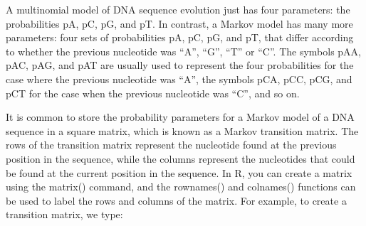 \documentclass[
]{book}
\begin{document}
A multinomial model of DNA sequence evolution just has four parameters: the probabilities pA, pC, pG, and pT. In contrast, a Markov model has many more parameters: four sets of probabilities pA, pC, pG, and pT, that differ according to whether the previous nucleotide was ``A'', ``G'', ``T'' or ``C''. The symbols pAA, pAC, pAG, and pAT are usually used to represent the four probabilities for the case where the previous nucleotide was ``A'', the symbols pCA, pCC, pCG, and pCT for the case when the previous nucleotide was ``C'', and so on.

It is common to store the probability parameters for a Markov model of a DNA sequence in a square matrix, which is known as a Markov transition matrix. The rows of the transition matrix represent the nucleotide found at the previous position in the sequence, while the columns represent the nucleotides that could be found at the current position in the sequence. In R, you can create a matrix using the matrix() command, and the rownames() and colnames() functions can be used to label the rows and columns of the matrix. For example, to create a transition matrix, we type:
\end{document}

